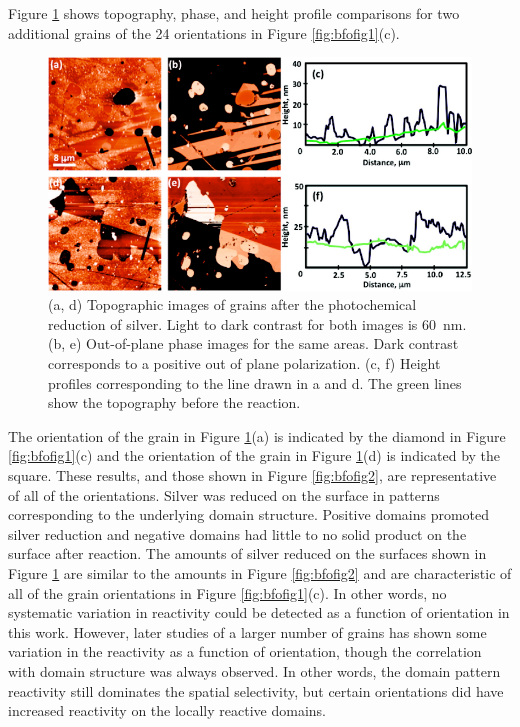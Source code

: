 Figure \ref{fig:bfofig3} shows  topography,  phase, and height profile
comparisons for two additional grains of the 24 orientations in Figure
\ref{fig:bfofig1}(c).
\begin{figure}
		\includegraphics[width=\textwidth]{bfofig3.pdf}
		\caption[Scanning probe data for additional grains]{%
			(a, d) Topographic images of  grains after the 
			photochemical reduction of silver. Light to dark contrast 
			for both images is \SI{60}{\nano\meter}. (b, e) Out-of-plane 
			 phase images for the same areas. Dark contrast corresponds 
			to a positive out of plane polarization. (c, f) Height profiles 
			corresponding to the line drawn in a and d. The green lines 
			show the topography before the reaction.}
		\label{fig:bfofig3}
\end{figure}
The orientation of the grain in Figure \ref{fig:bfofig3}(a) is indicated by the diamond in
Figure \ref{fig:bfofig1}(c) and the orientation of the grain in Figure
\ref{fig:bfofig3}(d) is indicated by the square. These results, and those shown in Figure
\ref{fig:bfofig2}, are representative of all of the orientations. Silver was reduced on
the surface in patterns corresponding to the underlying domain structure. Positive domains
promoted silver reduction and negative domains had little to no solid product on the
surface after reaction. The amounts of silver reduced on the surfaces shown in Figure
\ref{fig:bfofig3} are similar to the amounts in Figure \ref{fig:bfofig2} and are
characteristic of all of the grain orientations in Figure \ref{fig:bfofig1}(c). In other
words, no systematic variation in reactivity could be detected as a function of
orientation in this work. However, later studies of a larger number of grains has shown
some variation in the reactivity as a function of orientation, though the correlation with
domain structure was always observed. In other words, the domain pattern reactivity still
dominates the spatial selectivity, but certain orientations did have increased reactivity
on the locally reactive domains.



